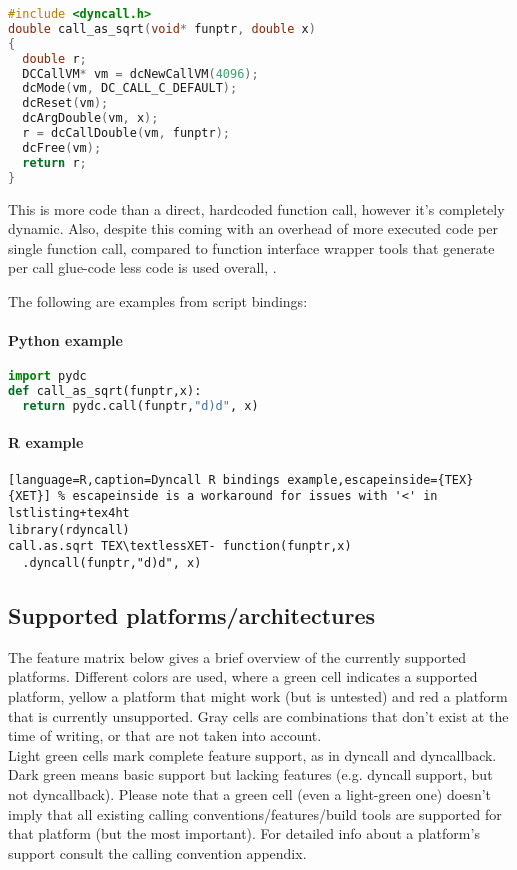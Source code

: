 \begin{lstlisting}[language=c,caption=Dyncall C library example]
#include <dyncall.h>
double call_as_sqrt(void* funptr, double x)
{
  double r;
  DCCallVM* vm = dcNewCallVM(4096);
  dcMode(vm, DC_CALL_C_DEFAULT);
  dcReset(vm);
  dcArgDouble(vm, x);  
  r = dcCallDouble(vm, funptr);
  dcFree(vm);
  return r;
}
\end{lstlisting}

This is more code than a direct, hardcoded function call, however it's completely dynamic.
Also, despite this coming with an overhead of more executed code per single function call,
compared to function interface wrapper tools that generate per call glue-code less code is
used overall, . %

The following are examples from script bindings:

\paragraph{Python example}

\begin{lstlisting}[language=python,caption=Dyncall Python bindings example]
import pydc
def call_as_sqrt(funptr,x):
  return pydc.call(funptr,"d)d", x)
\end{lstlisting}


\paragraph{R example}

\begin{lstlisting}[language=R,caption=Dyncall R bindings example,escapeinside={TEX}{XET}] % escapeinside is a workaround for issues with '<' in lstlisting+tex4ht
library(rdyncall)
call.as.sqrt TEX\textlessXET- function(funptr,x)
  .dyncall(funptr,"d)d", x)
\end{lstlisting}


\pagebreak

\subsection{Supported platforms/architectures}

The feature matrix below gives a brief overview of the currently supported
platforms. Different colors are used, where a green cell indicates a supported
platform, yellow a platform that might work (but is untested) and red a platform
that is currently unsupported. Gray cells are combinations that don't exist
at the time of writing, or that are not taken into account.\\
Light green cells mark complete feature support, as in dyncall and dyncallback. Dark green means basic support but lacking features (e.g. dyncall support, but not dyncallback).
Please note that a green cell (even a light-green one) doesn't imply that all existing calling conventions/features/build tools are supported for that platform (but the most
important). %
For detailed info about a platform's support consult the calling convention appendix.


